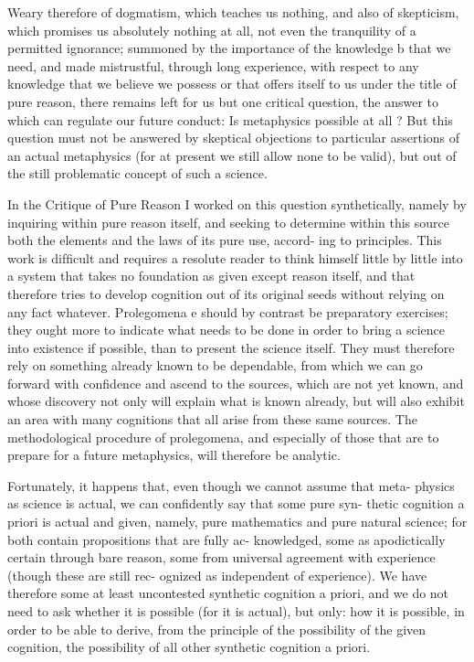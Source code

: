 Weary therefore of dogmatism, which teaches us nothing, and also
of skepticism, which promises us absolutely nothing at all, not even
the tranquility of a permitted ignorance; summoned by the importance
of the knowledge b that we need, and made mistrustful, through long
experience, with respect to any knowledge that we believe we possess or
that offers itself to us under the title of pure reason, there remains left
for us but one critical question, the answer to which can regulate our
future conduct: Is metaphysics possible at all ? But this question must not
be answered by skeptical objections to particular assertions of an actual
metaphysics (for at present we still allow none to be valid), but out of
the still problematic concept of such a science.

In the Critique of Pure Reason I worked on this question synthetically,
namely by inquiring within pure reason itself, and seeking to determine
within this source both the elements and the laws of its pure use, accord-
ing to principles. This work is difﬁcult and requires a resolute reader to
think himself little by little into a system that takes no foundation as given
except reason itself, and that therefore tries to develop cognition out of its
original seeds without relying on any fact whatever. Prolegomena e should
by contrast be preparatory exercises; they ought more to indicate what
needs to be done in order to bring a science into existence if possible,
than to present the science itself. They must therefore rely on something
already known to be dependable, from which we can go forward with
conﬁdence and ascend to the sources, which are not yet known, and
whose discovery not only will explain what is known already, but will
also exhibit an area with many cognitions that all arise from these same
sources. The methodological procedure of prolegomena, and especially
of those that are to prepare for a future metaphysics, will therefore be
analytic.

Fortunately, it happens that, even though we cannot assume that meta-
physics as science is actual, we can conﬁdently say that some pure syn-
thetic cognition a priori is actual and given, namely, pure mathematics
and pure natural science; for both contain propositions that are fully ac-
knowledged, some as apodictically certain through bare reason, some
from universal agreement with experience (though these are still rec-
ognized as independent of experience). We have therefore some at least
uncontested synthetic cognition a priori, and we do not need to ask whether
it is possible (for it is actual), but only: how it is possible, in order to be able
to derive, from the principle of the possibility of the given cognition, the
possibility of all other synthetic cognition a priori.

